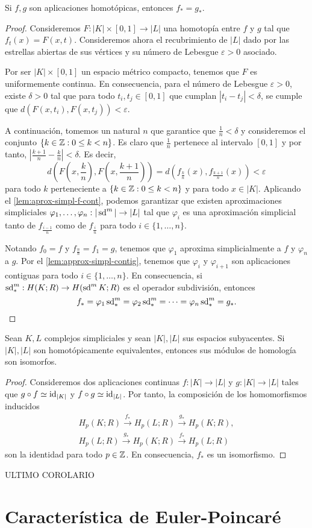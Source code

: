 \begin{teorema}
	Si $f,g$ son aplicaciones homotópicas, entonces $f_*=g_*$.
\end{teorema}
\begin{proof}
	Consideremos $F: |K| \times [0,1] \to |L|$ una homotopía entre $f$ y $g$ tal que $f_t(x) = F(x,t)$. Consideremos ahora el recubrimiento de $|L|$ dado por las estrellas abiertas de sus vértices y su número de Lebesgue $\varepsilon > 0$ asociado.

	Por ser $|K| \times [0,1]$ un espacio métrico compacto, tenemos que $F$ es uniformemente continua. En consecuencia, para el número de Lebesgue $\varepsilon > 0$, existe $\delta > 0$ tal que para todo $t_i, t_j \in [0,1]$ que cumplan $|t_i - t_j| < \delta$, se cumple que $d(F(x,t_i),F(x,t_j)) < \varepsilon$.

	A continuación, tomemos un natural $n$ que garantice que $\frac{1}{n} < \delta$ y consideremos el conjunto $\{ k \in \mathbb{Z} : 0 \leq k < n \}$. Es claro que $\frac{1}{n}$ pertenece al intervalo $[0,1]$ y por tanto, $|\frac{k+1}{n} - \frac{k}{n}| < \delta$. Es decir,
	\[
		d\left(F(x,\frac{k}{n}), F(x, \frac{k+1}{n})\right) = d\left(f_{\frac{k}{n}}(x), f_{\frac{k+1}{n}}(x)\right) < \varepsilon
	\]
	para todo $k$ perteneciente a $\{k \in \mathbb{Z} : 0 \leq k < n\}$ y para todo $x \in |K|$. Aplicando el \autoref{lem:aprox-simpl-f-cont}, podemos garantizar que existen aproximaciones simpliciales $\varphi_1, \dots, \varphi_n : |\operatorname{sd}^m| \to |L|$ tal que $\varphi_i$ es una aproximación simplicial tanto de $f_{\frac{i-1}{n}}$ como de $f_{\frac{i}{n}}$ para todo $i \in \{1, \dots, n\}$.

	Notando $f_0 = f$ y $f_{\frac{n}{n}} = f_1 = g$, tenemos que $\varphi_1$ aproxima simplicialmente a $f$ y $\varphi_{n}$ a $g$. Por el \autoref{lem:approx-simpl-contig}, tenemos que $\varphi_i$ y $\varphi_{i+1}$ son aplicaciones contiguas para todo $i \in \{1, \dots, n\}$. En consecuencia, si $\operatorname{sd}^m_* : H(K;R) \to H(\operatorname{sd}^m K;R)$ es el operador subdivisión, entonces
	\[
		f_* = \varphi_1 \operatorname{sd}^m_* = \varphi_2 \operatorname{sd}^m_* = \dots = \varphi_{n} \operatorname{sd}^m_* = g_*.
	\]
\end{proof}
\begin{corolario}
	Sean $K,L$ complejos simpliciales y sean $|K|,|L|$ sus espacios subyacentes. Si $|K|,|L|$ son homotópicamente equivalentes, entonces sus módulos de homología son isomorfos.
\end{corolario}
\begin{proof}
	Consideremos dos aplicaciones continuas $f: |K| \to |L|$ y $g: |K| \to |L|$ tales que $g \circ f \simeq \operatorname{id}_{|K|}$ y $f \circ g \simeq \operatorname{id}_{|L|}$. Por tanto, la composición de los homomorfismos inducidos
	\begin{gather*}
		H_p(K;R) \overset{f_*}{\to} H_p(L;R) \overset{g_*}{\to} H_p(K;R), \\
		H_p(L;R) \overset{g_*}{\to} H_p(K;R) \overset{f_*}{\to} H_p(L;R)
	\end{gather*}
	son la identidad para todo $p \in \mathbb{Z}$. En consecuencia, $f_*$ es un isomorfismo.
\end{proof}
ULTIMO COROLARIO

\section{Característica de Euler-Poincaré}

\endinput
